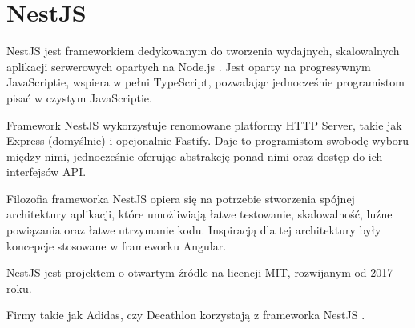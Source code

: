 \section{NestJS}


NestJS jest frameworkiem dedykowanym do tworzenia wydajnych, skalowalnych aplikacji serwerowych opartych na Node.js \cite{nestjsDocumentationNestJS}.
Jest oparty na progresywnym JavaScriptie, wspiera w pełni TypeScript, pozwalając jednocześnie programistom pisać w czystym JavaScriptie.

Framework NestJS wykorzystuje renomowane platformy HTTP Server, takie jak Express (domyślnie) i opcjonalnie Fastify.
Daje to programistom swobodę wyboru między nimi, jednocześnie oferując abstrakcję ponad nimi oraz dostęp do ich interfejsów API.

Filozofia frameworka NestJS opiera się na potrzebie stworzenia spójnej architektury aplikacji, które umożliwiają łatwe testowanie, skalowalność, luźne powiązania oraz łatwe utrzymanie kodu.
Inspiracją dla tej architektury były koncepcje stosowane w frameworku Angular.

NestJS jest projektem o otwartym źródle na licencji MIT, rozwijanym od 2017 roku.

Firmy takie jak Adidas, czy Decathlon korzystają z frameworka NestJS \cite{reveloHeresHire}.